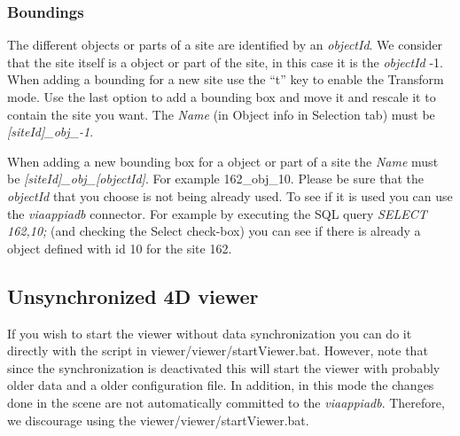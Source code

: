 \documentclass[a4paper,11pt]{article}
\begin{document}
\subsubsection{Boundings}

The different objects or parts of a site are identified by an \textit{objectId}. We consider that the site itself is a object or part of the site, in this case it is the \textit{objectId} -1. 
When adding a bounding for a new site use the ``t'' key to enable the Transform mode. Use the last option to add a bounding box and move it and rescale it to contain the site you want. The \textit{Name} (in Object info in Selection tab) must be \textit{[siteId]\_obj\_-1}.

When adding a new bounding box for a object or part of a site the \textit{Name} must be \textit{[siteId]\_obj\_[objectId]}. For example 162\_obj\_10. Please be sure that the \textit{objectId} that you choose is not being already used. To see if it is used you can use the \textit{viaappiadb} connector. For example by executing the SQL query \textit{SELECT 162,10;} (and checking the Select check-box) you can see if there is already a object defined with id 10 for the site 162. 

\subsection{Unsynchronized 4D viewer}

If you wish to start the viewer without data synchronization you can do it directly with the script in viewer/viewer/startViewer.bat. However, note that since the synchronization is deactivated this will start the viewer with probably older data and a older configuration file. In addition, in this mode the changes done in the scene are not automatically committed to the \textit{viaappiadb}. Therefore, we discourage using the viewer/viewer/startViewer.bat.





\end{document}
